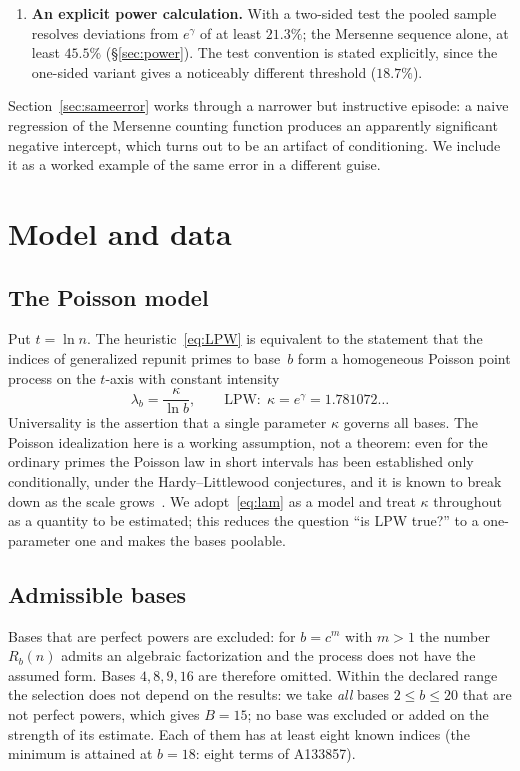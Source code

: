 \documentclass[11pt,a4paper]{article}
\theoremstyle{plain}
\theoremstyle{remark}
\newcommand{\Rb}{R_b}
\newcommand{\eg}{e^{\gamma}}
\begin{document}
\begin{enumerate}
\item\textbf{An explicit power calculation.} With a two-sided test the pooled
sample resolves deviations from $\eg$ of at least $21.3\%$; the Mersenne
sequence alone, at least $45.5\%$ (\S\ref{sec:power}). The test convention is
stated explicitly, since the one-sided variant gives a noticeably different
threshold ($18.7\%$).
\end{enumerate}

Section~\ref{sec:sameerror} works through a narrower but instructive episode: a
naive regression of the Mersenne counting function produces an apparently
significant negative intercept, which turns out to be an artifact of
conditioning. We include it as a worked example of the same error in a different
guise.

\section{Model and data}\label{sec:data}

\subsection{The Poisson model}
Put $t=\ln n$. The heuristic~\eqref{eq:LPW} is equivalent to the statement that
the indices of generalized repunit primes to base~$b$ form a homogeneous Poisson
point process on the $t$-axis with constant intensity
\begin{equation}\label{eq:lam}
\lambda_b=\frac{\kappa}{\ln b},\qquad \text{LPW:}\ \ \kappa=\eg=1.781072\ldots
\end{equation}
Universality is the assertion that a single parameter $\kappa$ governs all
bases. The Poisson idealization here is a working assumption, not a theorem:
even for the ordinary primes the Poisson law in short intervals has been
established only conditionally, under the Hardy--Littlewood conjectures, and it
is known to break down as the scale grows~\cite{jha2026}. We adopt~\eqref{eq:lam}
as a model and treat $\kappa$ throughout as a quantity to be estimated; this
reduces the question ``is LPW true?'' to a one-parameter one and makes the bases
poolable.

\subsection{Admissible bases}\label{sec:bases}
Bases that are perfect powers are excluded: for $b=c^{m}$ with $m>1$ the number
$\Rb(n)$ admits an algebraic factorization and the process does not have the
assumed form. Bases $4,8,9,16$ are therefore omitted. Within the declared range
the selection does not depend on the results: we take \emph{all} bases
$2\le b\le20$ that are not perfect powers, which gives $B=15$; no base was
excluded or added on the strength of its estimate. Each of them has at least
eight known indices (the minimum is attained at $b=18$: eight terms of A133857).
\end{document}
